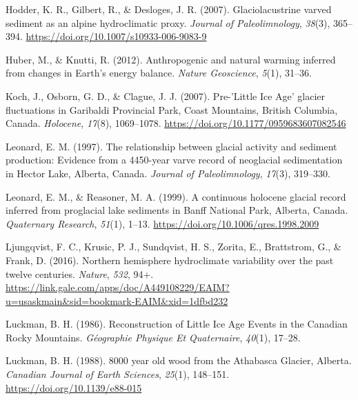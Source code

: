 \documentclass[
  letterpaper,
  DIV=11,
  numbers=noendperiod]{scrartcl}
\newlength{\cslhangindent}
\newlength{\cslentryspacingunit} %
\newenvironment{CSLReferences}[2] %
 {%
  \setlength{\parindent}{0pt}
  \ifodd #1
  \let\oldpar\par
  \def\par{\hangindent=\cslhangindent\oldpar}
  \fi
  \setlength{\parskip}{#2\cslentryspacingunit}
 }%
 {}
\begin{document}
\begin{CSLReferences}{1}{0}
\leavevmode{}%
Hodder, K. R., Gilbert, R., \& Desloges, J. R. (2007). {Glaciolacustrine
varved sediment as an alpine hydroclimatic proxy}. \emph{Journal of
Paleolimnology}, \emph{38}(3), 365--394.
\url{https://doi.org/10.1007/s10933-006-9083-9}

\leavevmode{}%
Huber, M., \& Knutti, R. (2012). {Anthropogenic and natural warming
inferred from changes in Earth's energy balance}. \emph{Nature
Geoscience}, \emph{5}(1), 31--36.

\leavevmode{}%
Koch, J., Osborn, G. D., \& Clague, J. J. (2007). {Pre-'Little Ice Age'
glacier fluctuations in Garibaldi Provincial Park, Coast Mountains,
British Columbia, Canada}. \emph{Holocene}, \emph{17}(8), 1069--1078.
\url{https://doi.org/10.1177/0959683607082546}

\leavevmode{}%
Leonard, E. M. (1997). {The relationship between glacial activity and
sediment production: Evidence from a 4450-year varve record of
neoglacial sedimentation in Hector Lake, Alberta, Canada}. \emph{Journal
of Paleolimnology}, \emph{17}(3), 319--330.

\leavevmode{}%
Leonard, E. M., \& Reasoner, M. A. (1999). {A continuous holocene
glacial record inferred from proglacial lake sediments in Banff National
Park, Alberta, Canada}. \emph{Quaternary Research}, \emph{51}(1), 1--13.
\url{https://doi.org/10.1006/qres.1998.2009}

\leavevmode{}%
Ljungqvist, F. C., Krusic, P. J., Sundqvist, H. S., Zorita, E.,
Brattstrom, G., \& Frank, D. (2016). {Northern hemisphere hydroclimate
variability over the past twelve centuries}. \emph{Nature}, \emph{532},
94+.
\url{https://link.gale.com/apps/doc/A449108229/EAIM?u=usaskmain\&sid=bookmark-EAIM\&xid=1dfbd232}

\leavevmode{}%
Luckman, B. H. (1986). {Reconstruction of Little Ice Age Events in the
Canadian Rocky Mountains}. \emph{G{é}ographie Physique Et Quaternaire},
\emph{40}(1), 17--28.

\leavevmode{}%
Luckman, B. H. (1988). {8000 year old wood from the Athabasca Glacier,
Alberta}. \emph{Canadian Journal of Earth Sciences}, \emph{25}(1),
148--151. \url{https://doi.org/10.1139/e88-015}


\end{CSLReferences}
\end{document}
